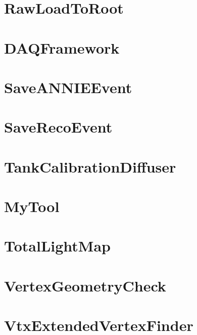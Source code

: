 \documentclass[twoside]{book}
\begin{document}
\chapter{Raw\-Load\-To\-Root}
\label{md_UserTools_RawLoadToRoot_README}
\hypertarget{md_UserTools_RawLoadToRoot_README}{}

\chapter{D\-A\-Q\-Framework}
\label{md_UserTools_README}
\hypertarget{md_UserTools_README}{}

\chapter{Save\-A\-N\-N\-I\-E\-Event}
\label{md_UserTools_SaveANNIEEvent_README}
\hypertarget{md_UserTools_SaveANNIEEvent_README}{}

\chapter{Save\-Reco\-Event}
\label{md_UserTools_SaveRecoEvent_README}
\hypertarget{md_UserTools_SaveRecoEvent_README}{}

\chapter{Tank\-Calibration\-Diffuser}
\label{md_UserTools_TankCalibrationDiffuser_README}
\hypertarget{md_UserTools_TankCalibrationDiffuser_README}{}

\chapter{My\-Tool}
\label{md_UserTools_template_README}
\hypertarget{md_UserTools_template_README}{}

\chapter{Total\-Light\-Map}
\label{md_UserTools_TotalLightMap_README}
\hypertarget{md_UserTools_TotalLightMap_README}{}

\chapter{Vertex\-Geometry\-Check}
\label{md_UserTools_VertexGeometryCheck_README}
\hypertarget{md_UserTools_VertexGeometryCheck_README}{}

\chapter{Vtx\-Extended\-Vertex\-Finder}
\label{md_UserTools_VtxExtendedVertexFinder_README}
\hypertarget{md_UserTools_VtxExtendedVertexFinder_README}{}

\end{document}
